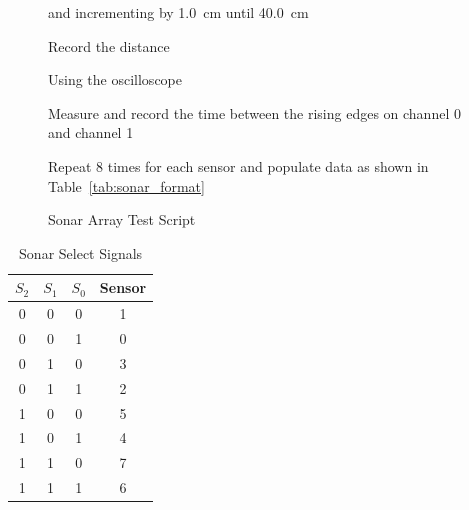 \documentclass{article}
\begin{document}
\begin{figure}[htb]
\begin{framed}
\begin{enumerate*}
\begin{enumerate*}
                and incrementing by \SI{1.0}{\centi\meter} until
                \SI{40.0}{\centi\meter}
                \item Record the distance
            \end{enumerate*}
            \item Using the oscilloscope
            \begin{enumerate*}
                \item Measure and record the time between the rising edges
                on channel 0 and channel 1
            \end{enumerate*}
            \item Repeat 8 times for each sensor and populate data
            as shown in Table~\ref{tab:sonar_format}
        \end{enumerate*}
        \end{framed}
        \caption{Sonar Array Test Script}
        \label{fig:hardware_script}
    \end{figure}

    \begin{table}[htb]
        \centering
        \begin{tabular}{|c|c|c|c|}
            \hline
            $S_2$
                & $S_1$
                & $S_0$
                & \textbf{Sensor}
            \\ \hline
            0 & 0 & 0 & 1 \\ \hline
            0 & 0 & 1 & 0 \\ \hline
            0 & 1 & 0 & 3 \\ \hline
            0 & 1 & 1 & 2 \\ \hline
            1 & 0 & 0 & 5 \\ \hline
            1 & 0 & 1 & 4 \\ \hline
            1 & 1 & 0 & 7 \\ \hline
            1 & 1 & 1 & 6 \\ \hline
        \end{tabular}
        \caption{Sonar Select Signals}
        \label{tab:sonar_select}
    \end{table}
\end{document}
